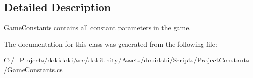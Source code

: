 \subsection{Detailed Description}
\hyperlink{class_game_constants}{Game\+Constants} contains all constant parameters in the game. 



The documentation for this class was generated from the following file\+:\begin{DoxyCompactItemize}
\item 
C\+:/\+\_\+\+Projects/dokidoki/src/doki\+Unity/\+Assets/dokidoki/\+Scripts/\+Project\+Constants/Game\+Constants.\+cs\end{DoxyCompactItemize}
